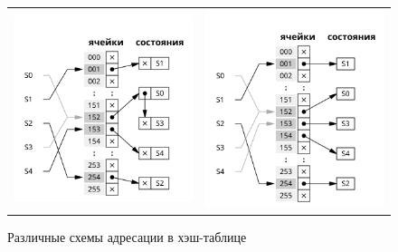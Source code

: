 \begin{figure}[ht]
  \centering
  \begin{tabular}{cc}
    \includegraphics{../graphics/hash-closed}
    &
    \includegraphics{../graphics/hash-open}
  \end{tabular}
  \caption{Различные схемы адресации в хэш-таблице}
  \label{fig:hash-addressing}
\end{figure}

